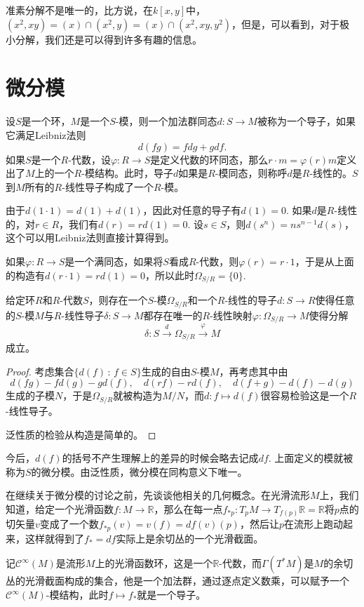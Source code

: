 准素分解不是唯一的，比方说，在$k[x,y]$中，$(x^2,xy)=(x)\cap (x^2,y)=(x)\cap (x^2,xy,y^2)$，但是，可以看到，对于极小分解，我们还是可以得到许多有趣的信息。

\section{微分模}

\para 设$S$是一个环，$M$是一个$S$-模，则一个加法群同态$d:S\to M$被称为一个导子，如果它满足Leibniz法则
\[
	d(fg)=fdg+gdf.
\]
如果$S$是一个$R$-代数，设$\varphi:R\to S$是定义代数的环同态，那么$r\cdot m=\varphi(r)m$定义出了$M$上的一个$R$-模结构。此时，导子$d$如果是$R$-模同态，则称呼$d$是$R$-线性的。$S$到$M$所有的$R$-线性导子构成了一个$R$-模。

由于$d(1\cdot 1)=d(1)+d(1)$，因此对任意的导子有$d(1)=0$. 如果$d$是$R$-线性的，对$r\in R$，我们有$d(r)=rd(1)=0$. 设$s\in S$，则$d(s^n)=ns^{n-1}d(s)$，这个可以用Leibniz法则直接计算得到。

如果$\varphi:R\to S$是一个满同态，如果将$S$看成$R$-代数，则$\varphi(r)=r\cdot 1$，于是从上面的构造有$d(r\cdot 1)=rd(1)=0$，所以此时$\Omega_{S/R}=\{0\}$.

\begin{pro}
给定环$R$和$R$-代数$S$，则存在一个$S$-模$\Omega_{S/R}$和一个$R$-线性的导子$d:S\to R$使得任意的$S$-模$M$与$R$-线性导子$\delta: S\to M$都存在唯一的$R$-线性映射$\varphi:\Omega_{S/R}\to M$使得分解
\[
	\delta:S\xrightarrow{d}\Omega_{S/R}\xrightarrow{\varphi}M
\]
成立。
\end{pro}

\begin{proof}
考虑集合$\{d(f)\,:\, f\in S\}$生成的自由$S$-模$M$，再考虑其中由
	\[
	d(fg)-fd(g)-gd(f),\quad d(rf)-rd(f),\quad d(f+g)-d(f)-d(g)
	\]
	生成的子模$N$，于是$\Omega_{S/R}$就被构造为$M/N$，而$d:f\mapsto d(f)$很容易检验这是一个$R$-线性导子。

	泛性质的检验从构造是简单的。
\end{proof}

今后，$d(f)$的括号不产生理解上的差异的时候会略去记成$df$. 上面定义的模就被称为$S$的微分模。由泛性质，微分模在同构意义下唯一。

\para 在继续关于微分模的讨论之前，先谈谈他相关的几何概念。在光滑流形$M$上，我们知道，给定一个光滑函数$f:M\to \mathbb{R}$，那么在每一点$f_{*p}:T_pM\to T_{f(p)}\mathbb{R}=\mathbb{R}$将$p$点的切矢量$v$变成了一个数$f_{*p}(v)=v(f)=df(v)(p)$，然后让$p$在流形上跑动起来，这样就得到了$f_*=df$实际上是余切丛的一个光滑截面。

记$\mathcal{C}^\infty(M)$是流形$M$上的光滑函数环，这是一个$\mathbb{R}$-代数，而$\Gamma(T^*M)$是$M$的余切丛的光滑截面构成的集合，他是一个加法群，通过逐点定义数乘，可以赋予一个$\mathcal{C}^\infty(M)$-模结构，此时$f\mapsto f_*$就是一个导子。

